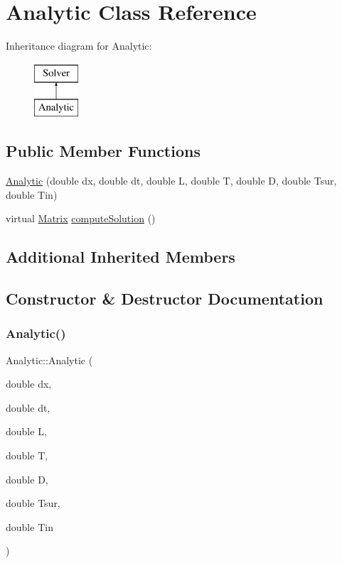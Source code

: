 \hypertarget{classAnalytic}{}\section{Analytic Class Reference}
\label{classAnalytic}
Inheritance diagram for Analytic\+:\begin{figure}[H]
\begin{center}
\leavevmode
\includegraphics[height=2.000000cm]{classAnalytic}
\end{center}
\end{figure}
\subsection*{Public Member Functions}
\begin{DoxyCompactItemize}
\item 
\mbox{\hyperlink{classAnalytic_a22578fb39f290a77a0a9bacfe85c6406}{Analytic}} (double dx, double dt, double L, double T, double D, double Tsur, double Tin)
\item 
virtual \mbox{\hyperlink{classMatrix}{Matrix}} \mbox{\hyperlink{classAnalytic_aaa59a993d9c1a9b9c5b581f8f3e9c5b3}{compute\+Solution}} ()
\end{DoxyCompactItemize}
\subsection*{Additional Inherited Members}


\subsection{Constructor \& Destructor Documentation}
\mbox{\label{classAnalytic_a22578fb39f290a77a0a9bacfe85c6406}} 
\subsubsection{\texorpdfstring{Analytic()}{Analytic()}}
{\footnotesize\ttfamily Analytic\+::\+Analytic (\begin{DoxyParamCaption}\item[{double}]{dx,  }\item[{double}]{dt,  }\item[{double}]{L,  }\item[{double}]{T,  }\item[{double}]{D,  }\item[{double}]{Tsur,  }\item[{double}]{Tin }\end{DoxyParamCaption})}

